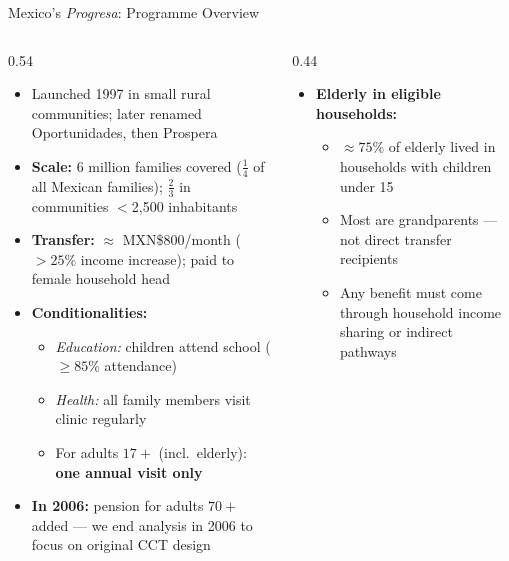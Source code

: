 \documentclass[aspectratio=169,usenames,dvipsnames]{beamer}
\newcommand{\smallcite}[1]{{\footnotesize\textcolor{Blue}{\citep{#1}}}}
\begin{document}
\begin{frame}{Mexico's \textit{Progresa}: Programme Overview}\label{progresa}
\small
\begin{columns}[T]
  \begin{column}{0.54\textwidth}
    \begin{itemize}
      \item[$\circ$] Launched 1997 in small rural communities; later renamed Oportunidades, then Prospera
      \vspace{4pt}
      \item[$\circ$] \textbf{Scale:} 6 million families covered ($\frac{1}{4}$ of all Mexican families); $\frac{2}{3}$ in communities $<$2,500 inhabitants
      \vspace{4pt}
      \item[$\circ$] \textbf{Transfer:} $\approx$ MXN\$800/month ($>25\%$ income increase); paid to female household head
      \vspace{4pt}
      \item[$\circ$] \textbf{Conditionalities:}
        \begin{itemize}
          \item \textit{Education:} children attend school ($\geq 85\%$ attendance)
          \item \textit{Health:} all family members visit clinic regularly
          \item For adults $17+$ (incl.\ elderly): \textbf{one annual visit only}
        \end{itemize}
      \vspace{4pt}
      \item[$\circ$] \textbf{In 2006:} pension for adults $70+$ added --- we end analysis in 2006 to focus on original CCT design
    \end{itemize}
  \end{column}
  \begin{column}{0.44\textwidth}
    \vspace{2mm}
    \begin{itemize}
      \item[$\circ$] \textbf{Elderly in eligible households:}
        \begin{itemize}
          \item $\approx 75\%$ of elderly lived in households with children under 15 \smallcite{BehrmanParker2013Demography}
          \item Most are grandparents --- not direct transfer recipients
          \item Any benefit must come through household income sharing or indirect pathways

\end{itemize}
\end{itemize}
\end{column}
\end{columns}
\end{frame}
\end{document}
